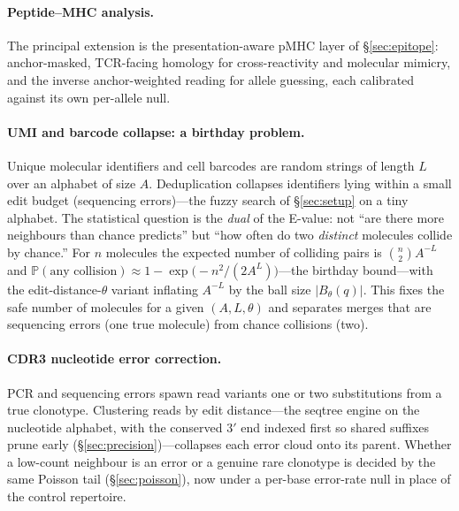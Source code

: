 \documentclass[11pt]{article}
\theoremstyle{oldplain}
\theoremstyle{oldrem}
\newcommand{\ball}[2]{B_{#1}(#2)}
\newcommand{\Prob}{\mathbb{P}}
\begin{document}
\paragraph{Peptide--MHC analysis.} The principal extension is the presentation-aware pMHC layer of
\S\ref{sec:epitope}: anchor-masked, TCR-facing homology for cross-reactivity and molecular mimicry,
and the inverse anchor-weighted reading for allele guessing, each calibrated against its own
per-allele null.

\paragraph{UMI and barcode collapse: a birthday problem.} Unique molecular identifiers and cell
barcodes are random strings of length $L$ over an alphabet of size $A$. Deduplication collapses
identifiers lying within a small edit budget (sequencing errors)---the fuzzy search of
\S\ref{sec:setup} on a tiny alphabet. The statistical question is the \emph{dual} of the E-value: not
``are there more neighbours than chance predicts'' but ``how often do two \emph{distinct} molecules
collide by chance.'' For $n$ molecules the expected number of colliding pairs is $\binom{n}{2}A^{-L}$
and $\Prob(\text{any collision})\approx 1-\exp\!\big(-n^2/(2A^L)\big)$---the birthday bound---with the
edit-distance-$\theta$ variant inflating $A^{-L}$ by the ball size $|\ball{\theta}{q}|$. This fixes
the safe number of molecules for a given $(A,L,\theta)$ and separates merges that are sequencing
errors (one true molecule) from chance collisions (two).

\paragraph{CDR3 nucleotide error correction.} PCR and sequencing errors spawn read variants one or
two substitutions from a true clonotype. Clustering reads by edit distance---the seqtree engine on
the nucleotide alphabet, with the conserved $3'$ end indexed first so shared suffixes prune early
(\S\ref{sec:precision})---collapses each error cloud onto its parent. Whether a low-count neighbour is
an error or a genuine rare clonotype is decided by the same Poisson tail (\S\ref{sec:poisson}), now
under a per-base error-rate null in place of the control repertoire.



\end{document}

